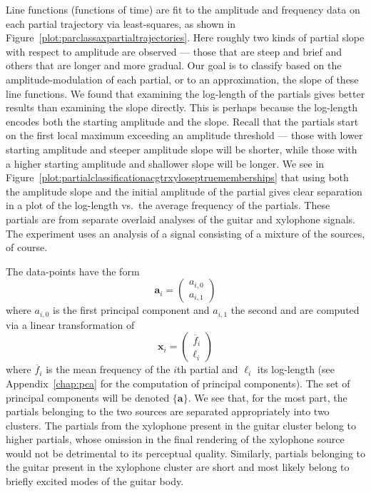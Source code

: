 Line functions (functions of time) are fit to the amplitude and frequency data
on each partial trajectory via least-squares, as shown in
Figure~\ref{plot:parclassaxpartialtrajectories}. Here roughly two kinds of
partial slope with respect to amplitude are observed --- those that are steep and brief and
others that are longer and more gradual. Our goal is to classify based
on the amplitude-modulation of each partial, or to an approximation, the slope
of these line functions. We found that examining the log-length of the partials
gives better results than examining the slope directly. This is perhaps
because the log-length encodes both the starting amplitude and the slope. Recall
that the partials start on the first local maximum exceeding an amplitude
threshold --- those with lower starting amplitude and steeper amplitude slope will be
shorter, while those with a higher starting amplitude and shallower slope will
be longer. We see in
Figure~\ref{plot:partialclassificationacgtrxyloseptruememberships} that using
both the amplitude slope and the initial amplitude of the partial gives clear
separation in a plot of the log-length vs.\ the
average frequency of
the partials. These partials are from separate overlaid analyses of the guitar
and xylophone signals. The experiment uses an analysis of a signal consisting of
a mixture of the sources, of course.

The data-points have the form
\[
    \boldsymbol{a}_i = \begin{pmatrix}
        a_{i,0} \\
        a_{i,1}
    \end{pmatrix}
\]
where $a_{i,0}$ is the first principal component and $a_{i,1}$ the second and are computed via a
linear transformation of
\[
    \boldsymbol{x}_i
    =
    \begin{pmatrix}
        \overline{f}_{i} \\
        \ell_{i}
    \end{pmatrix}
\]
where $\overline{f}_{i}$ is the mean frequency of the $i$th partial and
$\ell_{i}$ its log-length (see
Appendix~\ref{chap:pca} for the computation of principal components). The set of
principal components will be denoted $\{\boldsymbol{a}\}$.
We see that, for the most part, the partials belonging to the two sources are
separated appropriately into two clusters. The partials from the xylophone
present in the guitar cluster belong to higher partials, whose omission in the
final rendering of the xylophone source would not be detrimental to its
perceptual quality. Similarly, partials belonging to the guitar present in the
xylophone cluster are short and most likely belong to briefly excited modes
of the guitar body.


